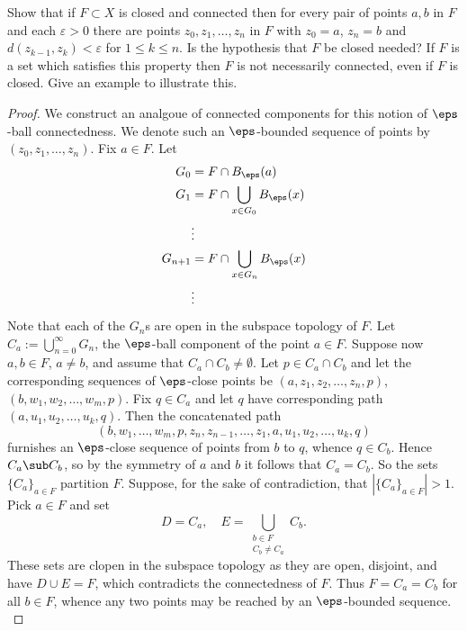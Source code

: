 \documentclass[12pt]{article}
\begin{document}
\begin{homeworkProblem}
  
Show that if $F \subset X$ is closed and connected then for every pair of points 
$a, b$ in $F$ and each $\varepsilon > 0$ there are points $z_0, z_1, \ldots, z_n$ 
in $F$ with $z_0 = a$, $z_n = b$ and $d(z_{k-1}, z_k) < \varepsilon$ for 
$1 \leq k \leq n$. Is the hypothesis that $F$ be closed needed? If $F$ is a set which 
satisfies this property then $F$ is not necessarily connected, even if $F$ is closed. 
Give an example to illustrate this.  

\begin{proof}
We construct an analgoue of connected components for this notion of $ \eps $-ball connectedness. We denote such an $ \eps $-bounded sequence of points by $ (z_{0},z_{1},\ldots, z_{n}) $. Fix $ a\in F $.
Let
\begin{align*}
  G_{0} &= F\cap B_{\eps}(a)\\
  G_{1}&= F\cap \bigcup_{x\in G_{0}} B_{\eps}(x)\\
  &\vdots\\
  G_{n+1}& = F\cap \bigcup_{x\in G_{n}} B_{\eps}(x)\\
  &\vdots
\end{align*}
Note that each of the $ G_{n} $s are open in the subspace topology of $ F $. Let $ C_{a}:= \bigcup_{n=0}^{\infty}G_{n} $, the $ \eps $-ball component of the point $ a\in F $. Suppose now $ a,b\in F $, $ a\neq b $, and assume that $ C_{a}\cap C_{b}\neq \emptyset $. Let $ p\in C_{a}\cap C_{b} $ and let the corresponding sequences of $ \eps $-close points be $ (a,z_{1},z_{2},\ldots,z_{n}, p) $, $ (b,w_{1},w_{2},\ldots, w_{m}, p) $. Fix $ q\in C_{a}  $ and let $ q $ have corresponding path $ (a,u_{1},u_{2},\ldots,u_{k}, q) $. Then the concatenated path
\[
  (b,w_{1},\ldots,w_{m},p,z_{n},z_{n-1},\ldots, z_{1},a, u_{1},u_{2},\ldots, u_{k}, q)
\]
furnishes an $ \eps $-close sequence of points from $ b $ to $ q $, whence $ q\in C_{b} $. Hence $ C_{a}\sub C_{b} $, so by the symmetry of $ a $ and $ b $ it follows that $ C_{a}= C_{b} $. So the sets $ \{C_{a}\}_{a\in F} $ partition $ F $. Suppose, for the sake of contradiction, that $ |\{C_{a}\}_{a\in F}| >1 $. Pick $ a\in F $ and set \[ D=C_{a},\quad  E=\bigcup_{\substack{b\in F\\C_{b}\neq C_{a}}}C_{b}. \]
These sets are clopen in the subspace topology as they are open, disjoint, and have $ D\cup E = F $, which contradicts the connectedness of $ F $. Thus $ F = C_{a} = C_{b} $ for all $ b\in F $, whence any two points may be reached by an $ \eps $-bounded sequence.\\



\end{proof}
\end{homeworkProblem}
\end{document}
